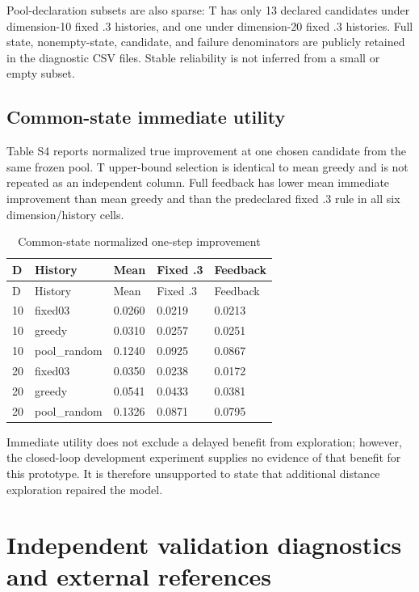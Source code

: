 \documentclass[cmc,article,submit,moreauthors,pdftex]{Definitions/tsp}
\begin{document}
Pool-declaration subsets are also sparse: T has only 13 declared candidates under dimension-10 fixed .3 histories, and one under dimension-20 fixed .3 histories. Full state, nonempty-state, candidate, and failure denominators are publicly retained in the diagnostic CSV files. Stable reliability is not inferred from a small or empty subset.

\hypertarget{common-state-immediate-utility}{%
\subsection{Common-state immediate utility}\label{common-state-immediate-utility}}

Table S4 reports normalized true improvement at one chosen candidate from the same frozen pool. T upper-bound selection is identical to mean greedy and is not repeated as an independent column. Full feedback has lower mean immediate improvement than mean greedy and than the predeclared fixed .3 rule in all six dimension/history cells.

\begin{longtable}[]{@{}lllll@{}}
\caption{Common-state normalized one-step improvement}\tabularnewline
\toprule
D & History & Mean & Fixed .3 & Feedback \\
\midrule
\endfirsthead
\toprule
D & History & Mean & Fixed .3 & Feedback \\
\midrule
\endhead
10 & fixed03 & 0.0260 & 0.0219 & 0.0213 \\
10 & greedy & 0.0310 & 0.0257 & 0.0251 \\
10 & pool\_random & 0.1240 & 0.0925 & 0.0867 \\
20 & fixed03 & 0.0350 & 0.0238 & 0.0172 \\
20 & greedy & 0.0541 & 0.0433 & 0.0381 \\
20 & pool\_random & 0.1326 & 0.0871 & 0.0795 \\
\bottomrule
\end{longtable}

Immediate utility does not exclude a delayed benefit from exploration; however, the closed-loop development experiment supplies no evidence of that benefit for this prototype. It is therefore unsupported to state that additional distance exploration repaired the model.

\hypertarget{independent-validation-diagnostics-and-external-references}{%
\section{Independent validation diagnostics and external references}\label{independent-validation-diagnostics-and-external-references}}
\end{document}
